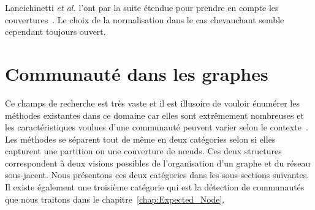 Lancichinetti \emph{et al.} l'ont par la suite étendue pour prendre en compte les couvertures~\cite{Lancichinetti2009c}.
Le choix de la normalisation dans le cas chevauchant semble cependant toujours ouvert\cite{McDaid2011,Zhang2015}.



\section{Communauté dans les graphes}
\label{sec:intro_communaute}

Ce champs de recherche est très vaste et il est illusoire de vouloir énumérer les méthodes existantes dans ce domaine car elles sont extrêmement nombreuses et les caractéristiques voulues d'une communauté peuvent varier selon le contexte~\cite{Leskovec2008,Coscia2011,Yang2015,Jeub2015}.
Les méthodes se séparent tout de même en deux catégories selon si elles capturent une partition ou une couverture de n\oe uds.
Ces deux structures correspondent à deux visions possibles de l'organisation d'un graphe et du réseau sous-jacent.
Nous présentons ces deux catégories dans les sous-sections suivantes.
Il existe également une troisième catégorie qui est la détection de communautés que nous traitons dans le chapitre~\ref{chap:Expected_Node}.

